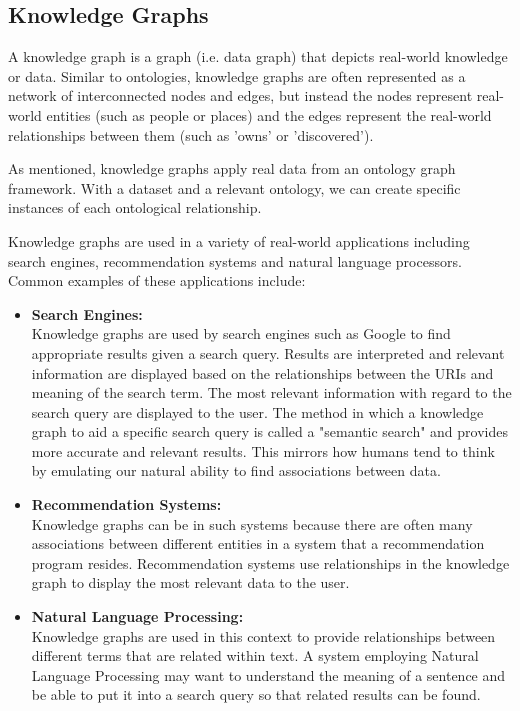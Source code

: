 \subsection{Knowledge Graphs}
\hspace{0.5cm} A knowledge graph is a graph (i.e. data graph) that depicts real-world knowledge or data. \cite{knowledgegraph} Similar to ontologies, knowledge graphs are often represented as a network of interconnected nodes and edges, but instead the nodes represent real-world entities (such as people or places) and the edges represent the real-world relationships between them (such as 'owns' or 'discovered'). 

As mentioned, knowledge graphs apply real data from an ontology graph framework. With a dataset and a relevant ontology, we can create specific instances of each ontological relationship. 

Knowledge graphs are used in a variety of real-world applications including search engines, recommendation systems and natural language processors. Common examples of these applications include:

\begin{itemize}
\item \textbf{Search Engines:} \\Knowledge graphs are used by search engines such as Google to find appropriate results given a search query. Results are interpreted and relevant information are displayed based on the relationships between the URIs and meaning of the search term. The most relevant information with regard to the search query are displayed to the user. The method in which a knowledge graph to aid a specific search query is called a "semantic search" and provides more accurate and relevant results. This mirrors how humans tend to think by emulating our natural ability to find associations between data.  \cite{searchengine}  

\item \textbf{Recommendation Systems:} \\Knowledge graphs can be in such systems because there are often many associations between different entities in a system that a recommendation program resides. Recommendation systems use relationships in the knowledge graph to display the most relevant data to the user. 

\item \textbf{Natural Language Processing:}\\ Knowledge graphs are used in this context to provide relationships between different terms that are related within text. A system employing Natural Language Processing may want to understand the meaning of a sentence and be able to put it into a search query so that related results can be found. 

\end{itemize}

